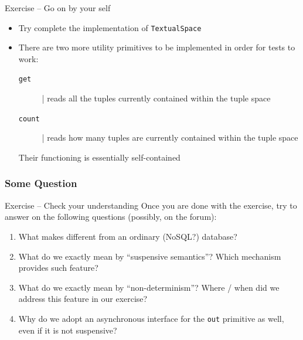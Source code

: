 \documentclass[presentation]{beamer}\mode<presentation>{\usetheme{AMSCesenaPurpleAndGold}}
\begin{document}
\begin{frame}{Exercise \currentExercise{} -- Go on by your self}
\begin{itemize}
	\item Try complete the implementation of \texttt{TextualSpace}

	\vfill

	\item There are two more utility primitives to be implemented in order for tests to work:
	\begin{description}
		\item[\texttt{get}] | reads \alert{all} the tuples currently contained within the tuple space
		\item[\texttt{count}] | reads \alert{how many} tuples are currently contained within the tuple space
	\end{description}
	Their functioning is essentially self-contained

\end{itemize}
\end{frame}

\subsubsection{Some Question}

\begin{frame}{Exercise \currentExercise{} -- Check your understanding}
Once you are done with the exercise, try to answer on the following questions (possibly, on the forum):
%
\vfill
%
\begin{enumerate}
	\item What makes \linda{} different from an ordinary (NoSQL?) database?

	\vfill

	\item What do we exactly mean by ``\alert{suspensive semantics}''? Which mechanism provides such feature?

	\vfill

	\item What do we exactly mean by ``\alert{non-determinism}''? Where / when did we address this feature in our exercise?

	\vfill

	\item Why do we adopt an asynchronous interface for the \texttt{\alert{out}} primitive as well, even if it is not suspensive?

\end{enumerate}
\end{frame}
\end{document}

